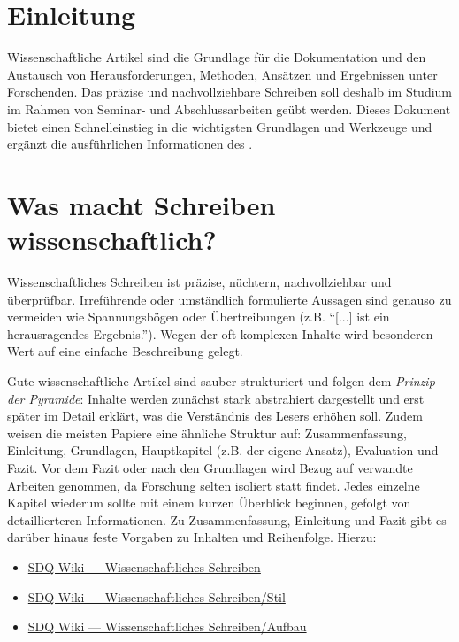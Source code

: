 \section{Einleitung}%
\label{sec:Einleitung}

Wissenschaftliche Artikel sind die Grundlage für die Dokumentation und den Austausch von Herausforderungen, Methoden, Ansätzen und Ergebnissen unter Forschenden.
Das präzise und nachvollziehbare Schreiben soll deshalb im Studium im Rahmen von Seminar- und Abschlussarbeiten geübt werden.
Dieses Dokument bietet einen Schnelleinstieg in die wichtigsten Grundlagen und Werkzeuge und ergänzt die ausführlichen Informationen des .


\section{Was macht Schreiben wissenschaftlich?}%
\label{sec:WissenschaftlichesSchreiben}

Wissenschaftliches Schreiben ist präzise, nüchtern, nachvollziehbar und überprüfbar.
Irreführende oder umständlich formulierte Aussagen sind genauso zu vermeiden wie Spannungsbögen oder Übertreibungen (z.B. \enquote{[...] ist ein herausragendes Ergebnis.}).
Wegen der oft komplexen Inhalte wird besonderen Wert auf eine einfache Beschreibung gelegt.

Gute wissenschaftliche Artikel sind sauber strukturiert und folgen dem \emph{Prinzip der Pyramide}:
Inhalte werden zunächst stark abstrahiert dargestellt und erst später im Detail erklärt, was die Verständnis des Lesers erhöhen soll.
Zudem weisen die meisten Papiere eine ähnliche Struktur auf: Zusammenfassung, Einleitung, Grundlagen, Hauptkapitel (z.B. der eigene Ansatz), Evaluation und Fazit.
Vor dem Fazit oder nach den Grundlagen wird Bezug auf verwandte Arbeiten genommen, da Forschung selten isoliert statt findet.
Jedes einzelne Kapitel wiederum sollte mit einem kurzen Überblick beginnen, gefolgt von detaillierteren Informationen.
Zu Zusammenfassung, Einleitung und Fazit gibt es darüber hinaus feste Vorgaben zu Inhalten und Reihenfolge.
Hierzu:

\smallskip
\begin{itemize}[label={\symbolInfo}]
    \item \href{https://sdqweb.ipd.kit.edu/wiki/Wissenschaftliches_Schreiben}{SDQ-Wiki --- Wissenschaftliches Schreiben }
    \item \href{https://sdqweb.ipd.kit.edu/wiki/Wissenschaftliches_Schreiben/Stil}{SDQ Wiki --- Wissenschaftliches Schreiben/Stil}
    \item \href{https://sdqweb.ipd.kit.edu/wiki/Wissenschaftliches_Schreiben/Aufbau}{SDQ Wiki --- Wissenschaftliches Schreiben/Aufbau}
\end{itemize}


